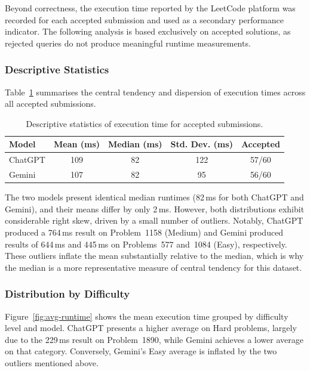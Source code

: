 \documentclass[11pt,a4paper]{article}
\begin{document}
Beyond correctness, the execution time reported by the LeetCode platform was recorded for each accepted submission and used as a secondary performance indicator. The following analysis is based exclusively on accepted solutions, as rejected queries do not produce meaningful runtime measurements.

\subsubsection{Descriptive Statistics}

Table~\ref{tab:runtime-stats} summarises the central tendency and dispersion of execution times across all accepted submissions.

\begin{table}[htbp]
\centering
\begin{tabular}{lcccc}
\hline
\textbf{Model} & \textbf{Mean (ms)} & \textbf{Median (ms)} & \textbf{Std. Dev. (ms)} & \textbf{Accepted} \\
\hline
ChatGPT & 109 & 82 & 122 & 57/60 \\
Gemini  & 107 & 82 &  95 & 56/60 \\
\hline
\end{tabular}
\caption{Descriptive statistics of execution time for accepted submissions.}
\label{tab:runtime-stats}
\end{table}

The two models present identical median runtimes (82\,ms for both ChatGPT and Gemini), and their means differ by only 2\,ms. However, both distributions exhibit considerable right skew, driven by a small number of outliers. Notably, ChatGPT produced a 764\,ms result on Problem~1158 (Medium) and Gemini produced results of 644\,ms and 445\,ms on Problems~577 and~1084 (Easy), respectively. These outliers inflate the mean substantially relative to the median, which is why the median is a more representative measure of central tendency for this dataset.

\subsubsection{Distribution by Difficulty}

Figure~\ref{fig:avg-runtime} shows the mean execution time grouped by difficulty level and model. ChatGPT presents a higher average on Hard problems, largely due to the 229\,ms result on Problem~1890, while Gemini achieves a lower average on that category. Conversely, Gemini's Easy average is inflated by the two outliers mentioned above.
\end{document}
